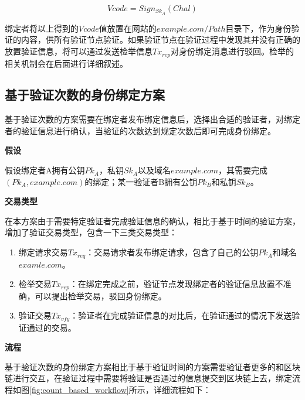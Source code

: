 \begin{equation}\label{eqSign}
Vcode = Sign_{Sk_A}(Chal)
\end{equation}

绑定者将以上得到的$Vcode$值放置在网站的$example.com/Path$目录下，作为身份验证的内容，供所有验证节点验证。如果验证节点在验证过程中发现其并没有正确的放置验证信息，将可以通过发送检举信息$Tx_{rep}$对身份绑定消息进行驳回。检举的相关机制会在后面进行详细叙述。


\subsection{基于验证次数的身份绑定方案}\label{ver_num}

基于验证次数的方案需要在绑定者发布绑定信息后，选择出合适的验证者，对绑定者的验证信息进行确认，当验证的次数达到规定次数后即可完成身份绑定。

\noindent\textbf{假设}

假设绑定者A拥有公钥$Pk_A$，私钥$Sk_A$以及域名$example.com$，其需要完成$(Pk_A, example.com)$的绑定；某一验证者B拥有公钥$Pk_B$和私钥$Sk_B$。

\noindent\textbf{交易类型}

在本方案由于需要特定验证者完成验证信息的确认，相比于基于时间的验证方案，增加了验证交易类型，包含一下三类交易类型：

\begin{enumerate}
	\item 绑定请求交易$Tx_{req}$：交易请求者发布绑定请求，包含了自己的公钥$Pk_A$和域名$examle.com$。
	\item 检举交易$Tx_{rep}$：在绑定完成之前，验证节点发现绑定者的验证信息放置不准确，可以提出检举交易，驳回身份绑定。
	\item 验证交易$Tx_{vfy}$：验证者在完成验证信息的对比后，在验证通过的情况下发送验证通过的交易。
\end{enumerate}

\noindent\textbf{流程}

基于验证次数的身份绑定方案相比于基于验证时间的方案需要验证者更多的和区块链进行交互，在验证过程中需要将验证是否通过的信息提交到区块链上去，绑定流程如图\ref{fig:count_based_workflow}所示，详细流程如下：


